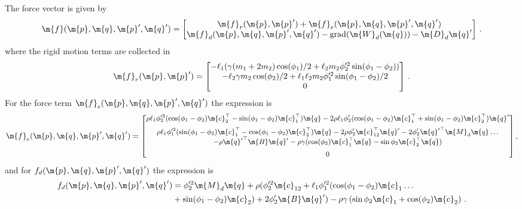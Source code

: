 %
The force vector is given by
%
\begin{equation}
  \m{f}(\m{p}, \m{q}, \m{p}^\prime, \m{q}^\prime) = \begin{bmatrix}
    \m{f}_r(\m{p}, \m{p}^\prime) + \m{f}_e(\m{p}, \m{q}, \m{p}^\prime, \m{q}^\prime) \\
    \m{f}_{d}(\m{p}, \m{q}, \m{p}^\prime, \m{q}^\prime) - \mathrm{grad}(\m{W}_{d}(\m{q})) - \m{D}_{d} \m{q}^\prime
  \end{bmatrix} \, \text{.}
\end{equation}
%
where the rigid motion terms are collected in
%
\begin{equation*}
  \m{f}_r(\m{p}, \m{p}^\prime) = \begin{bmatrix}
    -\ell_1(\gamma(m_1 + 2m_2) \cos(\phi_1)/2 + \ell_2 m_2 \phi_2^{\prime2} \sin(\phi_1 - \phi_2)) \\
    -\ell_2 \gamma m_2 \cos(\phi_2)/2 + \ell_1 \ell_2 m_2 \phi_1^{\prime2} \sin(\phi_1 - \phi_2)/2 \\
    0
  \end{bmatrix} \, \text{.}
\end{equation*}
%
For the force term $\m{f}_e(\m{p}, \m{q}, \m{p}^\prime, \m{q}^\prime)$ the expression is
%
\begin{equation*}
  \m{f}_e(\m{p}, \m{q}, \m{p}^\prime, \m{q}^\prime) = \small{\begin{bmatrix}
    \rho \ell_1 \phi_2^{\prime2}(\cos(\phi_1 - \phi_2)\m{c}_2^\top - \sin(\phi_1 - \phi_2)\m{c}_1^\top) \m{q}-2 \rho \ell_1 \phi_2^\prime(\cos(\phi_1 - \phi_2)\m{c}_1^\top + \sin(\phi_1 - \phi_2)\m{c}_2^\top) \m{q}^\prime \\[0.5em]
    \rho \ell_1 \phi_1^{\prime2}(\sin(\phi_1 - \phi_2)\m{c}_1^\top - \cos(\phi_1 - \phi_2)\m{c}_2^\top) \m{q}-2 \rho \phi_2^\prime \m{c}_{12}^\top \m{q}^\prime-2 \phi_2^\prime {\m{q}^\prime}^\top \m{M}_{d} \m{q} \dots\\
    -\rho {\m{q}^\prime}^\top \m{B} \m{q}^\prime - \rho \gamma(\cos(\phi_2) \m{c}_1^\top \m{q} - \sin \phi_2 \m{c}_2^\top \m{q}) \\[0.5em]
    0
\end{bmatrix}} \, \text{,}
\end{equation*}
%
and for $f_{d}(\m{p}, \m{q}, \m{p}^\prime, \m{q}^\prime)$ the expression is
%
\begin{align*}
  f_{d}(\m{p}, \m{q}, \m{p}^\prime, \m{q}^\prime) &= \phi_2^{\prime2} \m{M}_{d} \m{q}+\rho(\phi_2^{\prime2} \m{c}_{12}+\ell_1 \phi_1^{\prime2}(\cos(\phi_1 - \phi_2) \m{c}_1 \dots \\
  &+ \sin(\phi_1 - \phi_2) \m{c}_2)+2 \phi_2^\prime \m{B} \m{q}^\prime)-\rho \gamma\left(\sin \phi_2 \m{c}_1+\cos(\phi_2) \m{c}_2\right) \, \text{.}
\end{align*}

